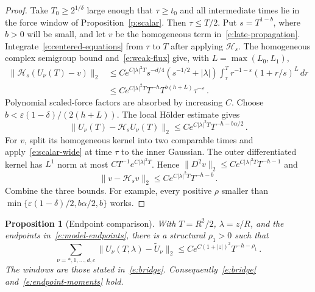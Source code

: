 \documentclass[11pt]{amsart}
\newtheorem{proposition}{Proposition}[section]
\theoremstyle{definition}
\theoremstyle{remark}
\numberwithin{equation}{section}
\begin{document}
\begin{proof}
Take $T_0\geq2^{1/\delta}$ large enough that $\tau\geq t_0$ and all intermediate times lie in the force window of Proposition~\ref{p:scalar}. Then $\tau\leq T/2$. Put $s=T^{1-b}$, where $b>0$ will be small, and let $v$ be the homogeneous term in~\eqref{e:late-propagation}. Integrate~\eqref{e:centered-equations} from $\tau$ to $T$ after applying $\mathcal H_s$. The homogeneous complex semigroup bound and~\eqref{e:weak-flux} give, with $L=\max(L_0,L_1)$,
\begin{align*}
 \|\mathcal H_s(U_\nu(T)-v)\|_2
 &\leq Ce^{C|\lambda|^2T}s^{-d/4}(s^{-1/2}+|\lambda|)
       \int_\tau^T r^{-1-\varepsilon}(1+r/s)^L\,dr\\
 &\leq Ce^{C|\lambda|^2T}T^{-h}
       T^{b(h+L)}\tau^{-\varepsilon}\, .
\end{align*}
Polynomial scaled-force factors are absorbed by increasing $C$. Choose $b<\varepsilon(1-\delta)/(2(h+L))$. The local H\"older estimate gives
\begin{equation*}
 \|U_\nu(T)-\mathcal H_sU_\nu(T)\|_2
 \leq Ce^{C|\lambda|^2T}T^{-h-b\alpha/2}\, .
\end{equation*}
For $v$, split its homogeneous kernel into two comparable times and apply~\eqref{e:scalar-wide} at time $\tau$ to the inner Gaussian. The outer differentiated kernel has $L^1$ norm at most $CT^{-1}e^{C|\lambda|^2T}$. Hence $\|D^2v\|_2\leq Ce^{C|\lambda|^2T}T^{-h-1}$ and
\begin{equation*}
 \|v-\mathcal H_sv\|_2
 \leq Ce^{C|\lambda|^2T}T^{-h-b}\, .
\end{equation*}
Combine the three bounds. For example, every positive $\rho$ smaller than $\min\{\varepsilon(1-\delta)/2,b\alpha/2,b\}$ works.
\end{proof}

\begin{proposition}[Endpoint comparison]\label{p:endpoint-comparison}
With $T=R^2/2$, $\lambda=z/R$, and the endpoints in~\eqref{e:model-endpoints}, there is a structural $\rho_1>0$ such that
\begin{equation}\label{e:endpoint-comparison}
 \sum_{\nu=*,1,\ldots,d,c}
       \|U_\nu(T,\lambda)-\widetilde U_\nu\|_2
 \leq Ce^{C(1+|z|)^2}T^{-h-\rho_1}\, .
\end{equation}
The windows are those stated in~\eqref{e:bridge}. Consequently~\eqref{e:bridge} and~\eqref{e:endpoint-moments} hold.
\end{proposition}
\end{document}
